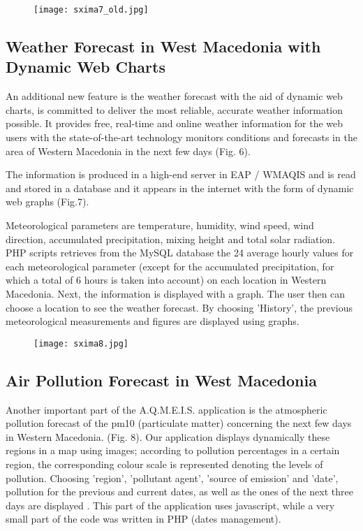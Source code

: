 \documentclass[conference]{IEEEtran}
\begin{document}
\begin{figure}[!h]
	\centering
	\texttt{[image: sxima7\_old.jpg]}
\caption{}
\end{figure}



\subsection{Weather Forecast in West Macedonia with Dynamic Web Charts}
 
An additional new feature is the weather forecast with the aid of dynamic web charts, is committed to deliver  the most reliable, accurate weather information possible. It provides free, real-time and online weather information for the web users with the state-of-the-art technology monitors conditions and forecasts in the area of Western Macedonia in the next few days (Fig. 6).

The information is produced in a high-end server  in EAP / WMAQIS \cite {triantkrestou2011} and is read and stored in a database and  it appears in the internet with the form of dynamic web graphs (Fig.7).

 
 Meteorological parameters are temperature, humidity, wind speed, wind direction, accumulated precipitation, mixing height and total solar radiation. PHP scripts retrieves from the MySQL database the 24 average hourly values for each meteorological parameter (except for the accumulated precipitation, for which a total of 6 hours is taken into account) on each location in Western Macedonia. Next, the information is displayed with a graph. The user then can choose a location to see the weather forecast. By choosing 'History', the previous meteorological measurements and figures are displayed using graphs.
 
\begin{figure}[!h]
	\centering
	\texttt{[image: sxima8.jpg]}
 
	\caption{}
\end{figure}


\subsection{Air Pollution Forecast in West Macedonia}
Another important part of the A.Q.M.E.I.S. application is the atmospheric pollution forecast of the pm10 (particulate matter) concerning the next few days in Western Macedonia. (Fig. 8).
 Our application displays dynamically these regions in a map using images; according to pollution percentages in a certain region, the corresponding colour scale is represented denoting the levels of pollution. Choosing 'region', 'pollutant agent', 'source of emission' and 'date',  pollution for the previous and current dates, as well as the ones of the next three days are displayed . This part of the application uses javascript, while a very small part of the code was written in PHP (dates management).
\end{document}
